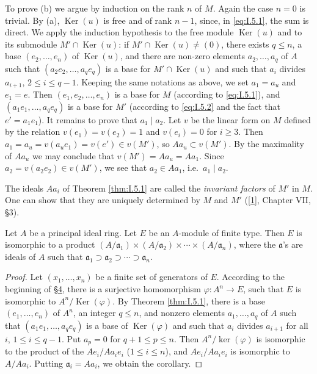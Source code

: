 To prove (b) we argue by induction on the rank $n$ of $M$. Again the case
$n=0$ is trivial. By (a), $\operatorname{Ker}(u)$ is free and of rank
$n-1$, since, in \eqref{eq:I.5.1}, the sum is direct. We apply the induction
hypothesis to the free module $\operatorname{Ker}(u)$ and to its submodule
$M'\cap\operatorname{Ker}(u)$: if
$M'\cap\operatorname{Ker}(u)\neq(0)$, there exists $q\leq n$, a base
$(e_{2},\ldots,e_{n})$ of $\operatorname{Ker}(u)$, and there are non-zero
elements $a_{2},\ldots,a_{q}$ of $A$ such that
$(a_{2}e_{2},\ldots,a_{q}e_{q})$ is a base for
$M'\cap\operatorname{Ker}(u)$ and such that $a_{i}$ divides $a_{i+1}$,
$2\leq i\leq q-1$. Keeping the same notations as above, we set $a_{1}=a_{u}$
and $e_{1}=e$. Then $(e_{1},e_{2},\ldots,e_{n})$ is a base for $M$ (according
to \eqref{eq:I.5.1}), and $(a_{1}e_{1},\ldots,a_{q}e_{q})$ is a base for
$M'$ (according to \eqref{eq:I.5.2} and the fact that $e'=a_{1}e_{1}$). It
remains to prove that $a_{1}\mid a_{2}$. Let $v$ be the linear form on $M$
defined by the relation $v(e_{1})=v(e_{2})=1$ and $v(e_{i})=0$ for
$i\geq3$. Then $a_{1}=a_{u}=v(a_{u}e_{1})=v(e')\in v(M')$, so
$Aa_{u}\subset v(M')$. By the maximality of $Aa_{u}$ we may conclude that
$v(M')=Aa_{u}=Aa_{1}$. Since $a_{2}=v(a_{2}e_{2})\in v(M')$, we see that
$a_{2}\in Aa_{1}$, i.e.\ $a_{1}\mid a_{2}$.

The ideals $Aa_{i}$ of Theorem \ref{thm:I.5.1} are called the
\emph{invariant factors} of $M'$ in $M$. One can show that they are uniquely
determined by $M$ and $M'$ (\hyperref[bib:1]{[1]}, Chapter VII, §3).

\begin{corollary}
\label{cor:I.5.1}
Let $A$ be a principal ideal ring. Let $E$ be an $A$-module of finite type.
Then $E$ is isomorphic to a product
$(A/\mathfrak{a}_{1})\times(A/\mathfrak{a}_{2})\times\cdots\times
(A/\mathfrak{a}_{n})$, where the $\mathfrak{a}$'s are ideals of $A$ such that
$\mathfrak{a}_{1}\supset\mathfrak{a}_{2}\supset\cdots\supset
\mathfrak{a}_{n}$.
\end{corollary}

\begin{proof}
Let $(x_{1},\ldots,x_{n})$ be a finite set of generators of $E$. According
to the beginning of \hyperref[sec:1.4]{§4}, there is a surjective homomorphism
$\varphi:A^{n}\to E$, such that $E$ is isomorphic to
$A^{n}/\operatorname{Ker}(\varphi)$. By Theorem \ref{thm:I.5.1}, there is a
base $(e_{1},\ldots,e_{n})$ of $A^{n}$, an integer $q\leq n$, and nonzero
elements $a_{1},\ldots,a_{q}$ of $A$ such that
$(a_{1}e_{1},\ldots,a_{q}e_{q})$ is a base of $\operatorname{Ker}(\varphi)$
and such that $a_{i}$ divides $a_{i+1}$ for all $i$, $1\leq i\leq q-1$. Put
$a_{p}=0$ for $q+1\leq p\leq n$. Then $A^{n}/\ker(\varphi)$ is isomorphic to
the product of the $Ae_{i}/Aa_{i}e_{i}$ ($1\leq i\leq n$), and
$Ae_{i}/Aa_{i}e_{i}$ is isomorphic to
$A/Aa_{i}$. Putting $\mathfrak{a}_{i}=Aa_{i}$, we obtain the corollary.
\end{proof}

